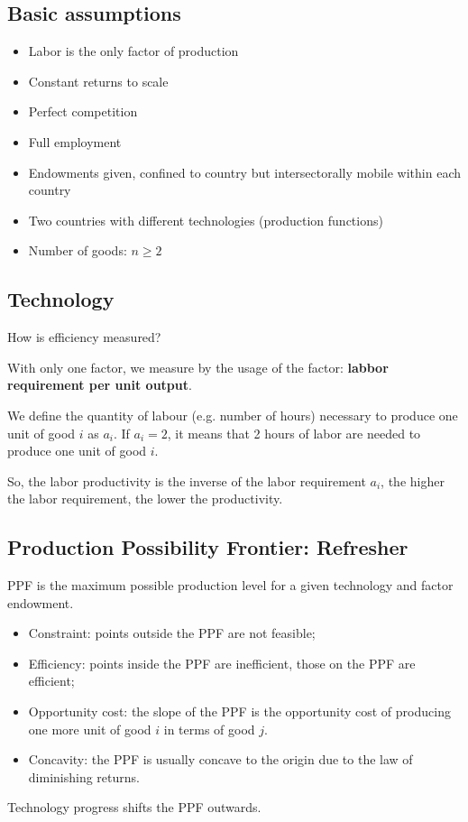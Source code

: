 \subsection{Basic assumptions}
\begin{itemize}
    \item Labor is the only factor of production
    \item Constant returns to scale
    \item Perfect competition
    \item Full employment
    \item Endowments given, confined to country but intersectorally mobile
    within each country
    \item Two countries with different technologies (production functions)
    \item Number of goods: $n \geq 2$
\end{itemize}

\subsection{Technology}

\begin{question}
    How is efficiency measured?
\end{question}
With only one factor, we measure by the usage of the factor: \textbf{labbor requirement per unit output}.

We define the quantity of labour (e.g. number of hours) necessary
to produce one unit of good $i$ as $a_i$. If $a_i=2$, it means that 2 hours of labor
are needed to produce one unit of good $i$.

So, the labor productivity is the inverse of the labor requirement $a_i$, the higher the labor requirement, the lower the productivity.

\subsection{Production Possibility Frontier: Refresher}

PPF is the maximum possible production level for a given technology and factor endowment.
\begin{itemize}
    \item Constraint: points outside the PPF are not feasible;
    \item Efficiency: points inside the PPF are inefficient, those on the PPF are efficient;
    \item Opportunity cost: the slope of the PPF is the opportunity cost of producing one more unit of good $i$ in terms of good $j$.
    \item Concavity: the PPF is usually concave to the origin due to the law of diminishing returns.
\end{itemize}
Technology progress shifts the PPF outwards.

